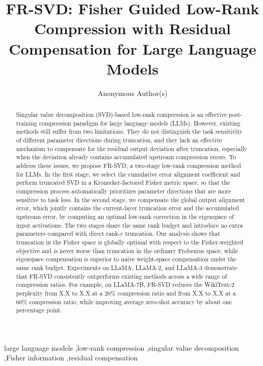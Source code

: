 \documentclass[a4paper,fleqn]{cas-dc}
\begin{document}
\let\WriteBookmarks\relax
\def\floatpagepagefraction{1}
\def\textpagefraction{.001}

\title[mode=title]{FR-SVD: Fisher Guided Low-Rank Compression with Residual Compensation for Large Language Models}

\author{Anonymous Author(s)}
\address{Anonymous Institution}

\begin{abstract}
Singular value decomposition (SVD)-based low-rank compression is an effective post-training compression paradigm for large language models (LLMs). However, existing methods still suffer from two limitations. They do not distinguish the task sensitivity of different parameter directions during truncation, and they lack an effective mechanism to compensate for the residual output deviation after truncation, especially when the deviation already contains accumulated upstream compression errors. To address these issues, we propose FR-SVD, a two-stage low-rank compression method for LLMs. In the first stage, we select the cumulative error alignment coefficient and perform truncated SVD in a Kronecker-factored Fisher metric space, so that the compression process automatically prioritizes parameter directions that are more sensitive to task loss. In the second stage, we compensate the global output alignment error, which jointly contains the current-layer truncation error and the accumulated upstream error, by computing an optimal low-rank correction in the eigenspace of input activations. The two stages share the same rank budget and introduce no extra parameters compared with direct rank-$r$ truncation. Our analysis shows that truncation in the Fisher space is globally optimal with respect to the Fisher-weighted objective and is never worse than truncation in the ordinary Frobenius space, while eigenspace compensation is superior to naive weight-space compensation under the same rank budget. Experiments on LLaMA, LLaMA-2, and LLaMA-3 demonstrate that FR-SVD consistently outperforms existing methods across a wide range of compression ratios. For example, on LLaMA-7B, FR-SVD reduces the WikiText-2 perplexity from X.X to X.X at a 20\% compression ratio and from X.X to X.X at a 60\% compression ratio, while improving average zero-shot accuracy by about one percentage point.
\end{abstract}

\begin{keywords}
large language models \sep low-rank compression \sep singular value decomposition \sep Fisher information \sep residual compensation
\end{keywords}
\end{document}
